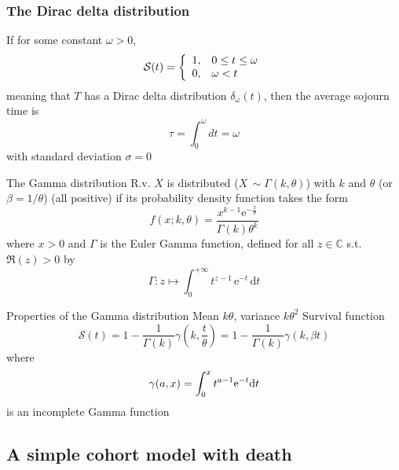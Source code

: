 \documentclass[aspectratio=169]{beamer}\usepackage[]{graphicx}\usepackage[]{xcolor}
\begin{document}
\begin{frame}\frametitle{The Dirac delta distribution}
If for some constant $\omega>0$,
\[
\S(t)=
\left\{
\begin{array}{ll}
1, & 0\leq t\leq\omega \\
0, & \omega<t
\end{array}
\right.
\]
meaning that $T$ has a Dirac delta distribution
$\delta_\omega(t)$, then the average sojourn time is
\[
\tau=\int_0^\omega dt=\omega
\]
with standard deviation $\sigma=0$
\end{frame}

\begin{frame}{The Gamma distribution}
R.v. $X$ is  distributed ($X\,\sim\Gamma(k, \theta)$) with  $k$ and  $\theta$ (or  $\beta = 1/\theta$) (all positive) if its probability density function takes the form
\begin{equation}\label{eq:gamma_distrib}
f(x;k,\theta) = \frac{x^{k-1} \mathrm{e}^{-\frac{x}{\theta}}}{\Gamma ( k)\theta ^k}
\end{equation}
where $x>0$ and $\Gamma$ is the Euler Gamma function, defined for all $z\in\mathbb{C}$ s.t. $\Re(z) > 0$ by
\[
\Gamma : z \mapsto \int_0^{+\infty}  t^{z-1}\,\mathrm{e}^{-t}\,\mathrm{d}t
\]
\end{frame}

\begin{frame}{Properties of the Gamma distribution}
Mean $k\theta$, variance $k\theta^2$
\vfill
Survival function
\[
\mathcal{S}(t)=
1-\frac{1}{\Gamma(k)}\gamma\left(
k,\frac{t}{\theta} 
\right)
=1-\frac{1}{\Gamma(k)}\gamma\left(
k,\beta t
\right)
\]
where 
\[
\gamma(a,x)=\int_0^x t^{a-1}{\rm e}^{-t}{\rm d}t
\]
is an incomplete Gamma function
\end{frame}





\subsection{A simple cohort model with death} 
\end{document}
